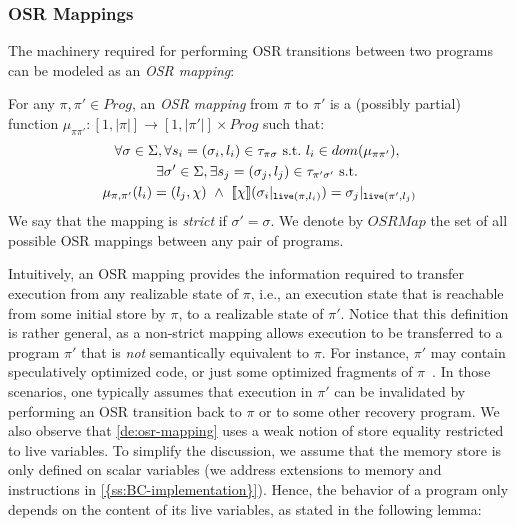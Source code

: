 
\subsubsection{OSR Mappings}
\label{ss:osr-mapping}

The machinery required for performing OSR transitions between two programs can be modeled as an {\em OSR mapping}:

\begin{definition}
\label{de:osr-mapping}
For any $\pi,\pi'\in Prog$, an {\em OSR mapping} from $\pi$ to $\pi'$ is a (possibly partial) function
$\mu_{\pi\pi'}:[1,|\pi|]\rightarrow [1,|\pi'|]\times Prog$ such that:
\begin{gather*}
\forall \sigma\in\Sigma, \forall s_i=(\sigma_i,l_i)\in\tau_{\pi\sigma}~\text{s.t.}~l_i\in dom(\mu_{\pi\pi'}),~\\
\exists \sigma'\in\Sigma, \exists s_j=(\sigma_j,l_j)\in\tau_{\pi'\sigma'}~\text{s.t.}~\\
\mu_{\pi,\pi'}(l_i)=(l_j,\chi)~\wedge~[\![\chi]\!](\sigma_i\vert_{\text{${\tt live}$}(\pi,l_i)})=\sigma_j\vert_{\text{${\tt live}$}(\pi',l_j)}
\end{gather*}
We say that the mapping is {\em strict} if $\sigma'=\sigma$. We denote by $OSRMap$ the set of all possible OSR mappings between any pair of programs.
\end{definition}

\noindent Intuitively, an OSR mapping provides the information required to transfer execution from any realizable state of $\pi$, i.e., an execution state that is reachable from some initial store by $\pi$, to a realizable state of $\pi'$. Notice that this definition is rather general, as a non-strict mapping allows execution to be transferred to a program $\pi'$ that is {\em not} semantically equivalent to $\pi$. For instance, $\pi'$ may contain speculatively optimized code, or just some optimized fragments of $\pi$~\cite{Guo11, Bala00, Gal09}. In those scenarios, one typically assumes that execution in $\pi'$ can be invalidated by performing an OSR transition back to $\pi$ or to some other recovery program. We also observe that \mydefinition\ref{de:osr-mapping} uses a weak notion of store equality restricted to live variables. To simplify the discussion, we assume that the memory store is only defined on scalar variables (we address extensions to memory  and  instructions in \mysection\ref{{ss:BC-implementation}}). Hence, the behavior of a program only depends on the content of its live variables, as stated in the following lemma:

